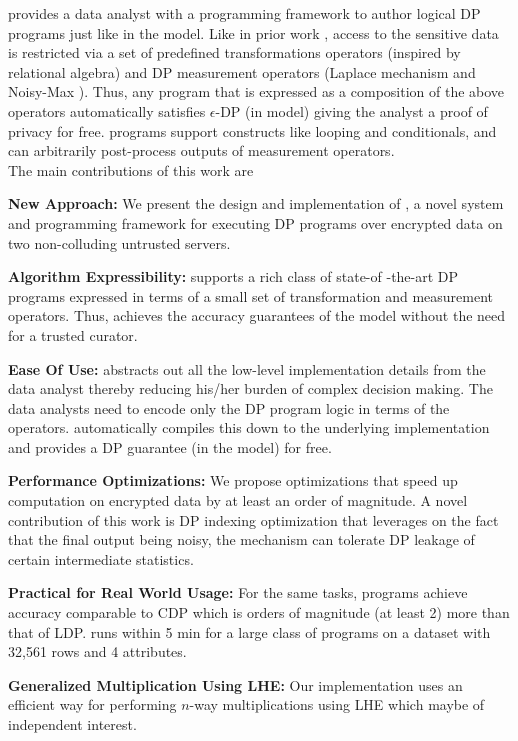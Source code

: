  \system provides a data analyst with a programming framework to author logical DP programs just like in the \cdp model.  Like in prior work \cite{PINQ, FWPINQ, ektelo}, access to the sensitive data is restricted via a set of predefined transformations operators (inspired by relational algebra) and DP measurement operators (Laplace mechanism and Noisy-Max \cite{Dork}). Thus, any program that is expressed as a composition of the above operators automatically satisfies $\epsilon$-DP (in \cdp model) giving the analyst a proof of privacy for free. 
 \system programs support constructs like looping and conditionals, and can arbitrarily post-process outputs of measurement operators.  \\The main contributions of this work are
\squishlist
\item \textbf{New Approach:} We present the design and implementation of \system, a novel system and programming framework for executing DP programs over encrypted data on two non-colluding untrusted servers. %
\item \textbf{Algorithm Expressibility:} \system supports a rich class of state-of -the-art DP programs expressed in terms of a small set of transformation and measurement operators. Thus, \system achieves the accuracy guarantees of the \cdp model without the need for a trusted curator.  
\item \textbf{Ease Of Use:} \system abstracts out all the low-level implementation details %
from the data analyst thereby reducing his/her burden of complex decision making. The data analysts need to encode only the DP program logic in terms of the \system operators. \system automatically compiles this down to the underlying implementation and provides a DP guarantee (in the \cdp model) for free. 
\item \textbf{Performance Optimizations:} %
We propose optimizations that speed up computation on encrypted data by at least an order of magnitude. A novel contribution of this work is DP indexing optimization that leverages on the fact that the final output being noisy, the mechanism can tolerate DP leakage of certain intermediate statistics. 
\item \textbf{Practical for Real World Usage:} %
For the same tasks, \system programs achieve accuracy comparable to \textsf{CDP} which is orders of magnitude (at least 2) more than that of \textsf{LDP}. \system runs within 5 min for a large class of programs on a dataset with 32,561 rows and 4 attributes. 
\item \textbf{Generalized Multiplication Using \textsf{LHE}:} Our implementation uses an efficient way for performing $n$-way multiplications using \textsf{LHE} which maybe of independent interest.
\squishend
 
  

